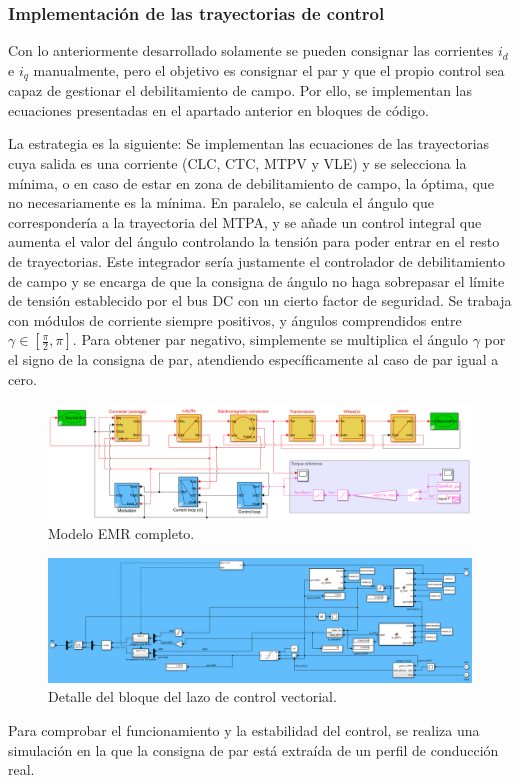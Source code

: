 \subsubsection{Implementación de las trayectorias de control}

Con lo anteriormente desarrollado solamente se pueden consignar las corrientes $i_d$ e $i_q$ manualmente, pero el objetivo es consignar el par y que el propio control sea capaz de gestionar el debilitamiento de campo. Por ello, se implementan las ecuaciones presentadas en el apartado anterior en bloques de código. 

La estrategia es la siguiente: Se implementan las ecuaciones de las trayectorias cuya salida es una corriente (CLC, CTC, MTPV y VLE) y se selecciona la mínima, o en caso de estar en zona de debilitamiento de campo, la óptima, que no necesariamente es la mínima. En paralelo, se calcula el ángulo que correspondería a la trayectoria del MTPA, y se añade un control integral que aumenta el valor del ángulo controlando la tensión para poder entrar en el resto de trayectorias. Este integrador sería justamente el controlador de debilitamiento de campo y se encarga de que la consigna de ángulo no haga sobrepasar el límite de tensión establecido por el bus DC con un cierto factor de seguridad. Se trabaja con módulos de corriente siempre positivos, y ángulos comprendidos entre $\gamma \in [\frac{\pi}{2}, \pi]$. Para obtener par negativo, simplemente se multiplica el ángulo $\gamma$ por el signo de la consigna de par, atendiendo específicamente al caso de par igual a cero.

\begin{figure}[H]
    \centering
    \includegraphics[width=1\linewidth]{fig/EMR_FULL.png}
    \caption{Modelo EMR completo.}
    
\end{figure}

\begin{figure}[H]
    \centering
    \includegraphics[width=1\linewidth]{fig/EMR_control.png}
    \caption{Detalle del bloque del lazo de control vectorial.}
    
\end{figure}
\newpage
Para comprobar el funcionamiento y la estabilidad del control, se realiza una simulación en la que la consigna de par está extraída de un perfil de conducción real.

